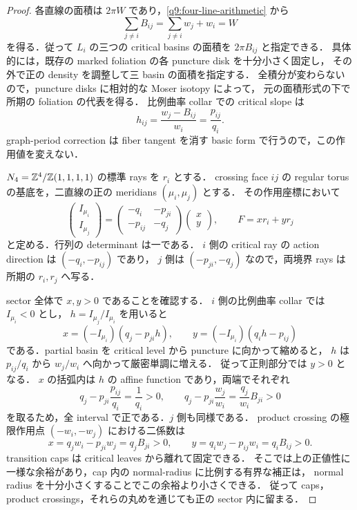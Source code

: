 \begin{proof}
各直線の面積は $2\pi W$ であり，\eqref{q9:four-line-arithmetic} から
\[
 \sum_{j\ne i}B_{ij}=\sum_{j\ne i}w_j+w_i=W
\]
を得る．従って $L_i$ の三つの critical basins の面積を $2\pi B_{ij}$ と指定できる．
具体的には，既存の marked foliation の各 puncture disk を十分小さく固定し，
その外で正の density を調整して三 basin の面積を指定する．
全積分が変わらないので，puncture disks に相対的な Moser isotopy によって，
元の面積形式の下で所期の foliation の代表を得る．
比例曲率 collar での critical slope は
\[
 h_{ij}=\frac{w_j-B_{ij}}{w_i}=\frac{p_{ij}}{q_i}.
\]
graph-period correction は fiber tangent を消す basic form で行うので，この作用値を変えない．

$N_4=\mathbb Z^4/\mathbb Z(1,1,1,1)$ の標準 rays を $r_i$ とする．
crossing face $ij$ の regular torus の基底を，二直線の正の meridians $(\mu_i,\mu_j)$ とする．
その作用座標において
\begin{equation}\label{q9:four-line-action-matrix}
 \begin{pmatrix}I_{\mu_i}\\I_{\mu_j}\end{pmatrix}
 =\begin{pmatrix}-q_i&-p_{ji}\\-p_{ij}&-q_j\end{pmatrix}
   \begin{pmatrix}x\\y\end{pmatrix},
 \qquad F=xr_i+yr_j
\end{equation}
と定める．行列の determinant は一である．
$i$ 側の critical ray の action direction は $(-q_i,-p_{ij})$ であり，
$j$ 側は $(-p_{ji},-q_j)$ なので，両境界 rays は所期の $r_i,r_j$ へ写る．

sector 全体で $x,y>0$ であることを確認する．
$i$ 側の比例曲率 collar では $I_{\mu_i}<0$ とし，
$h=I_{\mu_j}/I_{\mu_i}$ を用いると
\[
 x=(-I_{\mu_i})(q_j-p_{ji}h),\qquad
 y=(-I_{\mu_i})(q_i h-p_{ij})
\]
である．partial basin を critical level から puncture に向かって縮めると，
$h$ は $p_{ij}/q_i$ から $w_j/w_i$ へ向かって厳密単調に増える．
従って正則部分では $y>0$ となる．
$x$ の括弧内は $h$ の affine function であり，両端でそれぞれ
\[
 q_j-p_{ji}\frac{p_{ij}}{q_i}=\frac1{q_i}>0,
 \qquad
 q_j-p_{ji}\frac{w_j}{w_i}
   =\frac{q_j}{w_i}B_{ji}>0
\]
を取るため，全 interval で正である．$j$ 側も同様である．
product crossing の極限作用点 $(-w_i,-w_j)$ における二係数は
\[
 x=q_jw_i-p_{ji}w_j=q_jB_{ji}>0,
 \qquad
 y=q_iw_j-p_{ij}w_i=q_iB_{ij}>0.
\]
transition caps は critical leaves から離れて固定できる．
そこでは上の正値性に一様な余裕があり，cap 内の normal-radius に比例する有界な補正は，
normal radius を十分小さくすることでこの余裕より小さくできる．
従って caps，product crossings，それらの丸めを通じても正の sector 内に留まる．


\end{proof}
